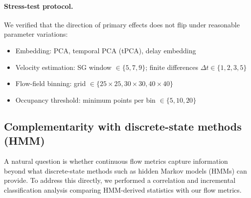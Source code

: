 \documentclass[5p,twocolumn,authoryear]{elsarticle}
\begin{document}
\paragraph{Stress-test protocol.}
We verified that the direction of primary effects does not flip under reasonable parameter variations:
\begin{itemize}
    \item Embedding: PCA, temporal PCA (tPCA), delay embedding
    \item Velocity estimation: SG window $\in \{5, 7, 9\}$; finite differences $\Delta t \in \{1, 2, 3, 5\}$
    \item Flow-field binning: grid $\in \{25 \times 25, 30 \times 30, 40 \times 40\}$
    \item Occupancy threshold: minimum points per bin $\in \{5, 10, 20\}$
\end{itemize}


\subsection{Complementarity with discrete-state methods (HMM)}
\label{app:hmm_baseline}

A natural question is whether continuous flow metrics capture information beyond what discrete-state methods such as hidden Markov models (HMMs) can provide. To address this directly, we performed a correlation and incremental classification analysis comparing HMM-derived statistics with our flow metrics.
\end{document}
